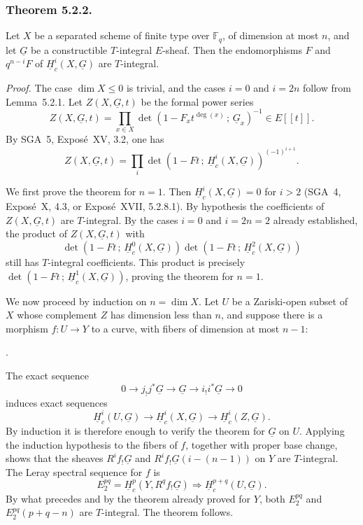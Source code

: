 \subsubsection*{Theorem 5.2.2.}
Let $X$ be a separated scheme of finite type over $\mathbb F_q$, of
dimension at most $n$, and let $\underline G$ be a constructible
$T$-integral $E$-sheaf.  Then the endomorphisms $F$ and $q^{n-i}F$ of
$\underline H_c^i(X,\underline G)$ are $T$-integral.

\medskip
\noindent\emph{Proof.}
The case $\dim X\leq0$ is trivial, and the cases $i=0$ and $i=2n$ follow
from Lemma~5.2.1.  Let $Z(X,\underline G,t)$ be the formal power series
\[
Z(X,\underline G,t)=
\prod_{x\in X}\det\!\left(1-F_xt^{\deg(x)}\,;\,\underline G_x\right)^{-1}
\in E[[t]].
\]
By SGA~5, Expos\'e~XV, 3.2, one has
\begin{equation}\tag{5.2.3}
Z(X,\underline G,t)=
\prod_i\det\!\left(1-Ft\,;\,\underline H_c^i(X,\underline G)\right)^{(-1)^{i+1}}.
\end{equation}

We first prove the theorem for $n=1$.  Then
$\underline H_c^i(X,\underline G)=0$ for $i>2$ (SGA~4, Expos\'e~X, 4.3,
or Expos\'e~XVII, 5.2.8.1).  By hypothesis the coefficients of
$Z(X,\underline G,t)$ are $T$-integral.  By the cases $i=0$ and $i=2n=2$
already established, the product of $Z(X,\underline G,t)$ with
\[
\det\!\left(1-Ft\,;\,\underline H_c^0(X,\underline G)\right)
\det\!\left(1-Ft\,;\,\underline H_c^2(X,\underline G)\right)
\]
still has $T$-integral coefficients.  This product is precisely
$\det(1-Ft\,;\,\underline H_c^1(X,\underline G))$, proving the theorem for
$n=1$.

We now proceed by induction on $n=\dim X$.  Let $U$ be a Zariski-open subset
of $X$ whose complement $Z$ has dimension less than $n$, and suppose there
is a morphism $f:U\longrightarrow Y$ to a curve, with fibers of dimension
at most $n-1$:
\begin{center}
\qquad .
\end{center}
The exact sequence
\[
0\longrightarrow j_!j^*\underline G\longrightarrow\underline G
\longrightarrow i_!i^*\underline G\longrightarrow0
\]
induces exact sequences
\[
\underline H_c^i(U,\underline G)\longrightarrow
\underline H_c^i(X,\underline G)\longrightarrow
\underline H_c^i(Z,\underline G).
\]
By induction it is therefore enough to verify the theorem for
$\underline G$ on $U$.  Applying the induction hypothesis to the fibers of
$f$, together with proper base change, shows that the sheaves
$R^if_!\underline G$ and $R^if_!\underline G(i-(n-1))$ on $Y$ are
$T$-integral.  The Leray spectral sequence for $f$ is
\[
E_2^{pq}=\underline H_c^p(Y,R^qf_!\underline G)
\Longrightarrow\underline H_c^{p+q}(U,\underline G).
\]
By what precedes and by the theorem already proved for $Y$, both
$E_2^{pq}$ and $E_2^{pq}(p+q-n)$ are $T$-integral.  The theorem follows.

